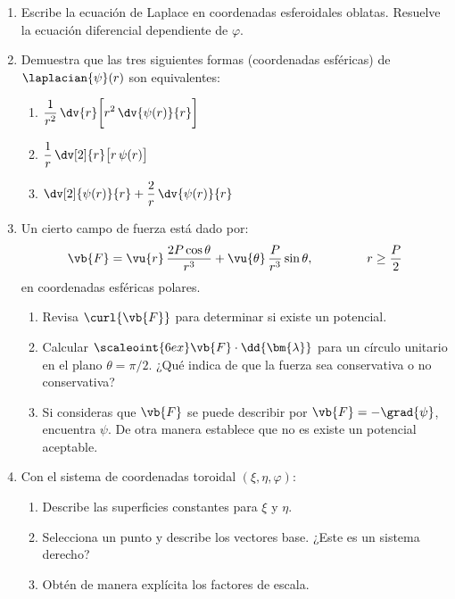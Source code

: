 \begin{enumerate}
\item Escribe la ecuación de Laplace en coordenadas esferoidales oblatas. Resuelve la ecuación diferencial dependiente de $\varphi$.
\item Demuestra que las tres siguientes formas (coordenadas esféricas) de $\laplacian{\psi} (r)$ son equivalentes:
\begin{multicols}{3}
\begin{enumerate}[label=\alph*)]
\item $\displaystyle \dfrac{1}{r^{2}} \, \dv{r} \bigg[ r^{2} \, \dv{\psi (r)}{r} \bigg]$
\item $\displaystyle  \dfrac{1}{r} \, \dv[2]{r} \big[ r \, \psi (r) \big]$
\item $\displaystyle  \dv[2]{\psi (r)}{r} + \dfrac{2}{r} \, \dv{\psi (r)}{r}$
\end{enumerate}
\end{multicols}
\item Un cierto campo de fuerza está dado por:
\begin{align*}
\vb{F} = \vu{r}\, \dfrac{2 P \cos \theta}{r^{3}} + \vu{\theta} \, \dfrac{P}{r^{3}} \sin \theta, \hspace{1.5cm} r \geq \dfrac{P}{2}
\end{align*}
en coordenadas esféricas polares.
\begin{enumerate}[label=\roman*)]
\item Revisa $\curl{\vb{F}}$ para determinar si existe un potencial.
\item Calcular $\scaleoint{6ex} \vb{F} \cdot \dd{\bm{\lambda}}$ para un círculo unitario en el plano $\theta = \pi/2$. ¿Qué indica de que la fuerza sea conservativa o no conservativa?
\item Si consideras que $\vb{F}$ se puede describir por $\vb{F} = - \grad{\psi}$, encuentra $\psi$. De otra manera establece que no es existe un potencial aceptable.
\end{enumerate}
\item Con el sistema de coordenadas toroidal $(\xi, \eta, \varphi)$:
\begin{enumerate}[label=\alph*)]
\item Describe las superficies constantes para $\xi$ y $\eta$.
\item Selecciona un punto y describe los vectores base. ¿Este es un sistema derecho?
\item Obtén de manera explícita los factores de escala.

\end{enumerate}
\end{enumerate}
